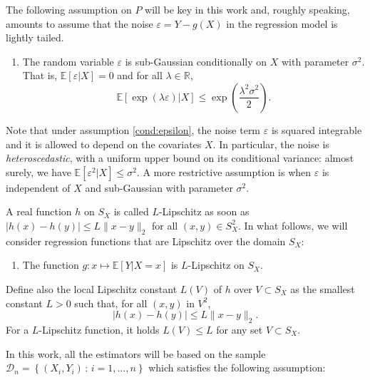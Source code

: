 \documentclass[paper=a4, fontsize=11pt]{scrartcl}
\begin{document}
The following assumption on $ P$ will be key in this work and, roughly speaking, amounts to assume that the noise $\varepsilon = Y  - g(X)$ in the regression model is lightly tailed.

\begin{enumerate}[label=(E), wide=0.5em,  leftmargin=*]
\item \label{cond:epsilon} 
The random variable $\varepsilon$ is sub-Gaussian conditionally on $X$ with parameter $\sigma^2$. That is, $\mathbb E [\varepsilon |X ]= 0$ and for all $\lambda \in \mathbb R$, $$ \mathbb E [ \exp( \lambda\varepsilon  ) |X ] \leq \exp\left( \frac{ \lambda ^2 \sigma^2}{ 2 }\right).$$
\end{enumerate}
Note that under assumption \ref{cond:epsilon}, the noise term $\varepsilon$ is squared integrable and it is allowed to depend on the covariates $X$.  In particular, the noise is \textit{heteroscedastic}, with a uniform upper bound on its conditional variance: almost surely, we have $\mathbb{E}[\varepsilon^2\vert X] \leq \sigma^2$. A more restrictive assumption is when $\varepsilon$ is independent of $X $ and sub-Gaussian with parameter $\sigma^2$.



A real function $h$ on $S_X$ is called $L$-Lipschitz as soon as $ | h(x) - h(y) |\leq L \|x-y\|_2$ for all $(x,y)\in S_X^2$.
  In what follows, we will consider regression functions that are Lipschitz over the domain $S_X$:
\begin{enumerate}[label=(L), wide=0.5em,  leftmargin=*]
  \item \label{cond:reg4} The function \( g: x \mapsto \mathbb E [ Y|X= x]\) is $L$-Lipschitz on \( S_X \). 
\end{enumerate}
Define also the local Lipschitz constant $ L(V)$ of $h$ over $V\subset S_X$ as the smallest constant $L>0$ such that, for all $(x ,y)$ in $V^2$,
$$     |h(x) - h(y) | \leq L  \|  x-y\|_2.$$ For a $L$-Lipschitz function, it holds $L(V)\leq L$ for any set $V\subset S_X$.


In this work, all the estimators will be based on the sample $\mathcal{D}_n=\left\{(X_i,Y_i) \,  : \, i=1,\ldots,n\right\}$ which satisfies the following assumption:
\end{document}
